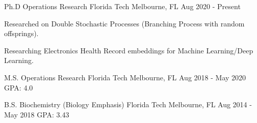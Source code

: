 \begin{cventries}
    
    \cventry
	{Ph.D Operations Research}
	{Florida Tech}
	{Melbourne, FL}
	{Aug 2020 - Present}
	{\begin{cvitems}
        \item {Researched on Double Stochastic Processes (Branching Process with random offsprings).}
        \item {Researching Electronics Health Record embeddings for Machine Learning/Deep Learning.}
        \end{cvitems}
		\vspace{-4mm}}
	
	\cventry
	{M.S. Operations Research}
	{Florida Tech}
	{Melbourne, FL}
	{Aug 2018 - May 2020}
	{GPA: 4.0}
	\vspace{-2mm}

    \cventry
	{B.S. Biochemistry (Biology Emphasis)}
	{Florida Tech}
	{Melbourne, FL}
	{Aug 2014 - May 2018}
	{GPA: 3.43}
	\vspace{-1mm}

\end{cventries}

\vspace{-2mm}